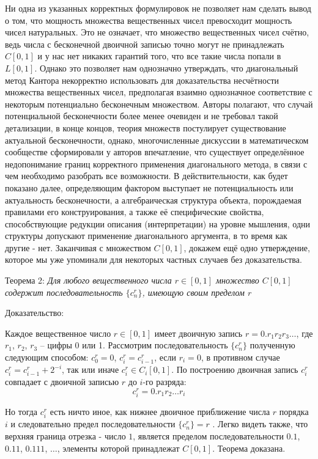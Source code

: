 \documentclass[12pt]{article}
\begin{document}
Ни одна из указанных корректных формулировок не позволяет нам сделать вывод о том, что мощность множества вещественных чисел превосходит мощность чисел натуральных. Это не означает, что множество вещественных чисел счётно, ведь числа с бесконечной двоичной записью точно могут не принадлежать $C[0, 1]$ и у нас нет никаких гарантий того, что все такие числа попали в $L[0, 1]$. Однако это позволяет нам однозначно утверждать, что диагональный метод Кантора некорректно использовать для доказательства несчётности множества вещественных чисел, предполагая взаимно однозначное соответствие с некоторым потенциально бесконечным множеством. Авторы полагают, что случай потенциальной бесконечности более менее очевиден и не требовал такой детализации, в конце концов, теория множеств постулирует существование актуальной бесконечности, однако, многочисленные дискуссии в математическом сообществе сформировали у авторов впечатление, что существует определённое недопонимание границ корректного применения диагонального метода, в связи с чем необходимо разобрать все возможности. В действительности, как будет показано далее, определяющим фактором выступает не потенциальность или актуальность бесконечности, а алгебраическая структура объекта, порождаемая правилами его конструирования, а также её специфические свойства, способствующие редукции описания (интерпретации) на уровне мышления, одни структуры допускают применение диагонального аргумента, в то время как другие - нет. Заканчивая с множеством $C[0, 1]$, докажем ещё одно утверждение, которое мы уже упоминали для некоторых частных случаев без доказательства.

Теорема 2: {\sl Для любого вещественного числа $r \in [0, 1]$ множество $C[0, 1]$ содержит последовательность $\{c^r_n\}$, имеющую своим пределом $r$}

Доказательство:

Каждое вещественное число $r \in [0, 1]$ имеет двоичную запись $r = 0.r_1r_2r_3\dots$, где $r_1$, $r_2$, $r_3$ – цифры 0 или 1. Рассмотрим последовательность $\{c^r_n\}$ полученную следующим способом: $c^r_0 = 0$, $c^r_i = c^r_{i - 1}$, если $r_i = 0$, в противном случае $c^r_i = c^r_{i - 1} + 2^{-i}$, так или иначе $c^r_i \in C_i[0, 1]$. По построению двоичная запись $c^r_i$ совпадает с двоичной записью $r$ до $i$-го разряда:
\begin{equation}
c^r_i = 0.r_1 r_2 \dots r_i
\end{equation}

Но тогда $c^r_i$ есть ничто иное, как нижнее двоичное приближение числа $r$ порядка $i$ и следовательно предел последовательности $\{c^r_n\} = r$ \cite{matan-bottom-limit}. Легко видеть также, что верхняя граница отрезка - число $1$, является пределом последовательности $0.1$, $0.11$, $0.111$, $\dots$, элементы которой принадлежат $C[0, 1]$. Теорема доказана.
\end{document}
